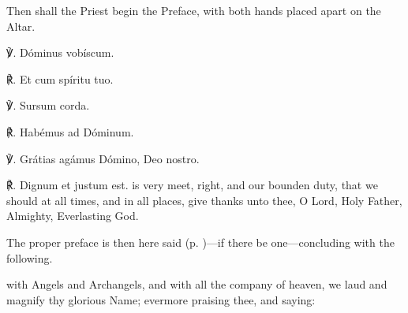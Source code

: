 \begin{rubric}
    Then shall the Priest begin the Preface, with both hands placed apart on the Altar.
\end{rubric}
℣. Dóminus vobíscum.

℟. Et cum spíritu tuo.

℣. Sursum corda.

℟. Habémus ad Dóminum.

℣. Grátias agámus Dómino, Deo nostro.

℟. Dignum et justum est.
 is very meet, right, and our bounden duty, that we should at all times, and in all places, give thanks unto thee, O Lord, Holy Father, Almighty, Everlasting God.
\begin{rubric}
    The proper preface is then here said (p. \pageref{prefaces})---if there be one---concluding with the following.
\end{rubric}
\label{PrefaceEnding}
 with Angels and Archangels, and with all the company of heaven, we laud and magnify thy glorious Name; evermore praising thee, and saying:%



